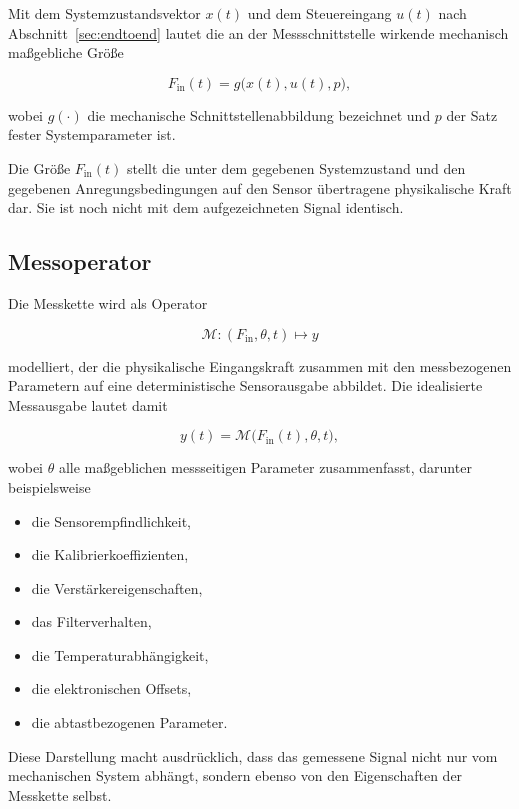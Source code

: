 \documentclass[12pt,a4paper]{report}
\begin{document}
Mit dem Systemzustandsvektor $x(t)$ und dem Steuereingang $u(t)$ nach
Abschnitt~\ref{sec:endtoend} lautet die an der Messschnittstelle wirkende
mechanisch maßgebliche Größe

\begin{equation}
F_{\mathrm{in}}(t) = g\bigl(x(t),u(t),p\bigr),
\label{eq:mech-input}
\end{equation}

wobei $g(\cdot)$ die mechanische Schnittstellenabbildung bezeichnet und
$p$ der Satz fester Systemparameter ist.

Die Größe $F_{\mathrm{in}}(t)$ stellt die unter dem gegebenen
Systemzustand und den gegebenen Anregungsbedingungen auf den Sensor
übertragene physikalische Kraft dar. Sie ist noch nicht mit dem
aufgezeichneten Signal identisch.

\subsection{Messoperator}

Die Messkette wird als Operator

\[
\mathcal{M} : (F_{\mathrm{in}}, \theta, t) \mapsto y
\]

modelliert, der die physikalische Eingangskraft zusammen mit den
messbezogenen Parametern auf eine deterministische Sensorausgabe
abbildet. Die idealisierte Messausgabe lautet damit

\begin{equation}
y(t) = \mathcal{M}\bigl(F_{\mathrm{in}}(t), \theta, t\bigr),
\label{eq:messoperator}
\end{equation}

wobei $\theta$ alle maßgeblichen messseitigen Parameter zusammenfasst,
darunter beispielsweise

\begin{itemize}
\item die Sensorempfindlichkeit,
\item die Kalibrierkoeffizienten,
\item die Verstärkereigenschaften,
\item das Filterverhalten,
\item die Temperaturabhängigkeit,
\item die elektronischen Offsets,
\item die abtastbezogenen Parameter.
\end{itemize}

Diese Darstellung macht ausdrücklich, dass das gemessene Signal nicht nur
vom mechanischen System abhängt, sondern ebenso von den Eigenschaften der
Messkette selbst.
\end{document}
